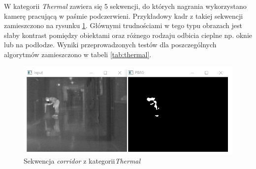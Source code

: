 W kategorii \textit{Thermal} zawiera się 5 sekwencji, do których nagrania wykorzystano kamerę pracującą w paśmie podczerwieni. 
Przykładowy kadr z takiej sekwencji zamieszczono na rysunku \ref{fig:thermal_example}. 
Głównymi trudnościami w tego typu obrazach jest słaby kontrast pomiędzy obiektami oraz różnego rodzaju odbicia cieplne np. oknie lub na podłodze.
Wyniki przeprowadzonych testów dla poszczególnych algorytmów zamieszczono w tabeli \ref{tab:thermal}.

    \begin{figure}[h]
			\centering
			\includegraphics[scale=0.85]{img/5/thermal_example.png}
			\caption{Sekwencja \textit{corridor} z kategorii\textit{Thermal}}
			\label{fig:thermal_example}
	\end{figure}

